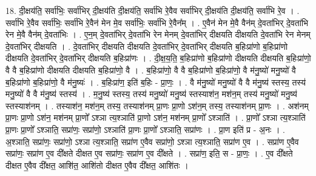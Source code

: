 \documentclass[17pt]{extarticle}
\begin{document}
18. दी॒क्षय॑ति॒ सर्वा॑भिः॒ सर्वा॑भिर् दी॒क्षय॑ति दी॒क्षय॑ति॒ सर्वा॑भि रे॒वैव सर्वा॑भिर् दी॒क्षय॑ति दी॒क्षय॑ति॒ सर्वा॑भि रे॒व । . सर्वा॑भि रे॒वैव सर्वा॑भिः॒ सर्वा॑भि रे॒वैन॑ मेन मे॒व सर्वा॑भिः॒ सर्वा॑भि रे॒वैन᳚म् । . ए॒वैन॑ मेन मे॒वै वैन॑म् दे॒वता॑भिर् दे॒वता॑भि रेन मे॒वै वैन॑म् दे॒वता॑भिः । . ए॒न॒म् दे॒वता॑भिर् दे॒वता॑भि रेन मेनम् दे॒वता॑भिर् दीक्षयति दीक्षयति दे॒वता॑भि रेन मेनम् दे॒वता॑भिर् दीक्षयति । . दे॒वता॑भिर् दीक्षयति दीक्षयति दे॒वता॑भिर् दे॒वता॑भिर् दीक्षयति ब॒हिःप्रा॑णो ब॒हिःप्रा॑णो दीक्षयति दे॒वता॑भिर् दे॒वता॑भिर् दीक्षयति ब॒हिःप्रा॑णः । . दी॒क्ष॒य॒ति॒ ब॒हिःप्रा॑णो ब॒हिःप्रा॑णो दीक्षयति दीक्षयति ब॒हिःप्रा॑णो॒ वै वै ब॒हिःप्रा॑णो दीक्षयति दीक्षयति ब॒हिःप्रा॑णो॒ वै । . ब॒हिःप्रा॑णो॒ वै वै ब॒हिःप्रा॑णो ब॒हिःप्रा॑णो॒ वै म॑नु॒ष्यो॑ मनु॒ष्यो॑ वै ब॒हिःप्रा॑णो ब॒हिःप्रा॑णो॒ वै म॑नु॒ष्यः॑ । . ब॒हिःप्रा॑ण॒ इति॑ ब॒हिः - प्रा॒णः॒ । . वै म॑नु॒ष्यो॑ मनु॒ष्यो॑ वै वै म॑नु॒ष्य॑ स्तस्य॒ तस्य॑ मनु॒ष्यो॑ वै वै म॑नु॒ष्य॑ स्तस्य॑ । . म॒नु॒ष्य॑ स्तस्य॒ तस्य॑ मनु॒ष्यो॑ मनु॒ष्य॑ स्तस्याश॑न॒ मश॑न॒म् तस्य॑ मनु॒ष्यो॑ मनु॒ष्य॑ स्तस्याश॑नम् । . तस्याश॑न॒ मश॑न॒म् तस्य॒ तस्याश॑नम् प्रा॒णः प्रा॒णो ऽश॑न॒म् तस्य॒ तस्याश॑नम् प्रा॒णः । . अश॑नम् प्रा॒णः प्रा॒णो ऽश॑न॒ मश॑नम् प्रा॒णो᳚ ऽश्ञा त्य॒श्ञाति॑ प्रा॒णो ऽश॑न॒ मश॑नम् प्रा॒णो᳚ ऽश्ञाति॑ । . प्रा॒णो᳚ ऽश्ञा त्य॒श्ञाति॑ प्रा॒णः प्रा॒णो᳚ ऽश्ञाति॒ सप्रा॑णः॒ सप्रा॑णो॒ ऽश्ञाति॑ प्रा॒णः प्रा॒णो᳚ ऽश्ञाति॒ सप्रा॑णः । . प्रा॒ण इति॑ प्र - अ॒नः । . अ॒श्ञाति॒ सप्रा॑णः॒ सप्रा॑णो॒ ऽश्ञा त्य॒श्ञाति॒ सप्रा॑ण ए॒वैव सप्रा॑णो॒ ऽश्ञा त्य॒श्ञाति॒ सप्रा॑ण ए॒व । . सप्रा॑ण ए॒वैव सप्रा॑णः॒ सप्रा॑ण ए॒व दी᳚क्षते दीक्षत ए॒व सप्रा॑णः॒ सप्रा॑ण ए॒व दी᳚क्षते । . सप्रा॑ण॒ इति॒ स - प्रा॒णः॒ । . ए॒व दी᳚क्षते दीक्षत ए॒वैव दी᳚क्षत॒ आशि॑त॒ आशि॑तो दीक्षत ए॒वैव दी᳚क्षत॒ आशि॑तः । \newline
\end{document}
